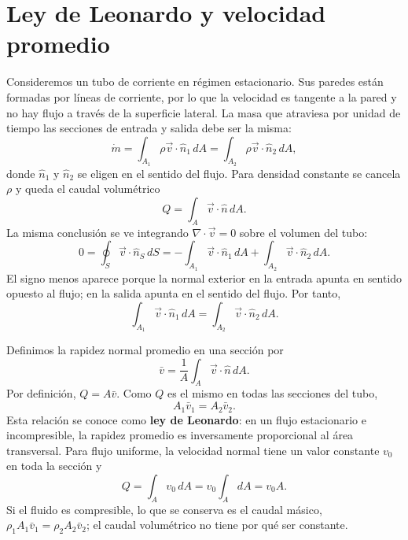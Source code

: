\section{Ley de Leonardo y velocidad promedio}

Consideremos un tubo de corriente en régimen estacionario. Sus paredes están formadas por líneas de corriente, por lo que la velocidad es tangente a la pared y no hay flujo a través de la superficie lateral. La masa que atraviesa por unidad de tiempo las secciones de entrada y salida debe ser la misma:
\[
\dot m
=\int_{A_1}\rho\vec v\cdot\hat n_1\,dA
=\int_{A_2}\rho\vec v\cdot\hat n_2\,dA,
\]
donde $\hat n_1$ y $\hat n_2$ se eligen en el sentido del flujo. Para densidad constante se cancela $\rho$ y queda el caudal volumétrico
\[
Q=\int_A\vec v\cdot\hat n\,dA.
\]
La misma conclusión se ve integrando $\nabla\cdot\vec v=0$ sobre el volumen del tubo:
\[
0=\oint_S\vec v\cdot\hat n_{\!S}\,dS
=-\int_{A_1}\vec v\cdot\hat n_1\,dA
+\int_{A_2}\vec v\cdot\hat n_2\,dA.
\]
El signo menos aparece porque la normal exterior en la entrada apunta en sentido opuesto al flujo; en la salida apunta en el sentido del flujo. Por tanto,
\[
\int_{A_1}\vec v\cdot\hat n_1\,dA
=\int_{A_2}\vec v\cdot\hat n_2\,dA.
\]

Definimos la rapidez normal promedio en una sección por
\[
\bar v=\frac{1}{A}\int_A\vec v\cdot\hat n\,dA.
\]
Por definición, $Q=A\bar v$. Como $Q$ es el mismo en todas las secciones del tubo,
\[
\boxed{A_1\bar v_1=A_2\bar v_2.}
\]
Esta relación se conoce como \textbf{ley de Leonardo}: en un flujo estacionario e incompresible, la rapidez promedio es inversamente proporcional al área transversal. Para flujo uniforme, la velocidad normal tiene un valor constante $v_0$ en toda la sección y
\[
Q=\int_A v_0\,dA
=v_0\int_A dA
=v_0A.
\]
Si el fluido es compresible, lo que se conserva es el caudal másico, $\rho_1A_1\bar v_1=\rho_2A_2\bar v_2$; el caudal volumétrico no tiene por qué ser constante.

